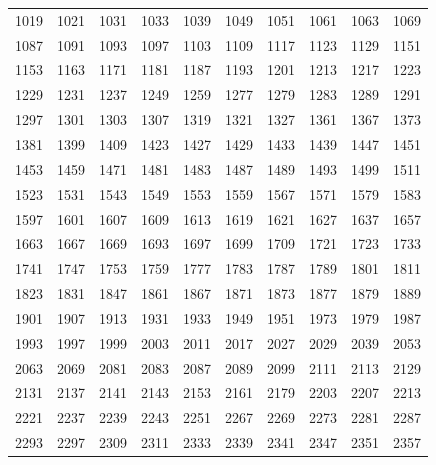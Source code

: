 \documentclass{article}
\begin{document}

\begin{tabular}{rrrrrrrrrr}
1019 & 1021 & 1031 & 1033 & 1039 & 1049 & 1051 & 1061 & 1063 & 1069 \\
1087 & 1091 & 1093 & 1097 & 1103 & 1109 & 1117 & 1123 & 1129 & 1151 \\
1153 & 1163 & 1171 & 1181 & 1187 & 1193 & 1201 & 1213 & 1217 & 1223 \\
1229 & 1231 & 1237 & 1249 & 1259 & 1277 & 1279 & 1283 & 1289 & 1291 \\
1297 & 1301 & 1303 & 1307 & 1319 & 1321 & 1327 & 1361 & 1367 & 1373 \\
1381 & 1399 & 1409 & 1423 & 1427 & 1429 & 1433 & 1439 & 1447 & 1451 \\
1453 & 1459 & 1471 & 1481 & 1483 & 1487 & 1489 & 1493 & 1499 & 1511 \\
1523 & 1531 & 1543 & 1549 & 1553 & 1559 & 1567 & 1571 & 1579 & 1583 \\
1597 & 1601 & 1607 & 1609 & 1613 & 1619 & 1621 & 1627 & 1637 & 1657 \\
1663 & 1667 & 1669 & 1693 & 1697 & 1699 & 1709 & 1721 & 1723 & 1733 \\
1741 & 1747 & 1753 & 1759 & 1777 & 1783 & 1787 & 1789 & 1801 & 1811 \\
1823 & 1831 & 1847 & 1861 & 1867 & 1871 & 1873 & 1877 & 1879 & 1889 \\
1901 & 1907 & 1913 & 1931 & 1933 & 1949 & 1951 & 1973 & 1979 & 1987 \\
1993 & 1997 & 1999 & 2003 & 2011 & 2017 & 2027 & 2029 & 2039 & 2053 \\
2063 & 2069 & 2081 & 2083 & 2087 & 2089 & 2099 & 2111 & 2113 & 2129 \\
2131 & 2137 & 2141 & 2143 & 2153 & 2161 & 2179 & 2203 & 2207 & 2213 \\
2221 & 2237 & 2239 & 2243 & 2251 & 2267 & 2269 & 2273 & 2281 & 2287 \\
2293 & 2297 & 2309 & 2311 & 2333 & 2339 & 2341 & 2347 & 2351 & 2357
\end{tabular}
\end{document}
